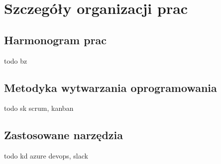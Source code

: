 \documentclass[10pt, titlepage, oneside, a4paper]{article}
\begin{document}
	\section{Szczegóły organizacji prac}  
 
	\subsection{Harmonogram prac}
	todo bz
 
	\subsection{Metodyka wytwarzania oprogramowania}
	todo sk scrum, kanban
	
	\subsection{Zastosowane narzędzia}
	todo kd azure devops, slack
 
\end{document}
